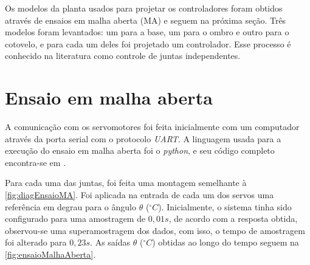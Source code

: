 Os modelos da planta usados para projetar os controladores foram obtidos através de ensaios em malha aberta (MA) e seguem 
na próxima seção. Três modelos foram levantados: um para a base, um para o ombro e outro para o cotovelo, e para 
cada um deles foi projetado um controlador. Esse processo é conhecido na literatura como controle de juntas independentes.

\section{Ensaio em malha aberta}

A comunicação com os servomotores foi feita inicialmente com um computador através da porta serial com o protocolo 
\textit{UART}. A linguagem usada para a execução do ensaio em malha aberta foi o \textit{python}, e seu código completo
encontra-se em \cite{lelis_model}.

Para cada uma das juntas, foi feita uma montagem semelhante à \autoref{fig:diagEnsaioMA}. Foi aplicada na entrada de
cada um dos servos uma referência em degrau para o ângulo $\theta$ ($^\circ C$). Inicialmente, o sistema tinha sido
configurado para uma amostragem de $0,01s$, de acordo com a resposta obtida, observou-se uma superamostragem dos dados,
com isso, o tempo de amostragem foi alterado para $0,23s$. As saídas $\theta$ ($^\circ C$) obtidas
ao longo do tempo seguem na \autoref{fig:ensaioMalhaAberta}.

